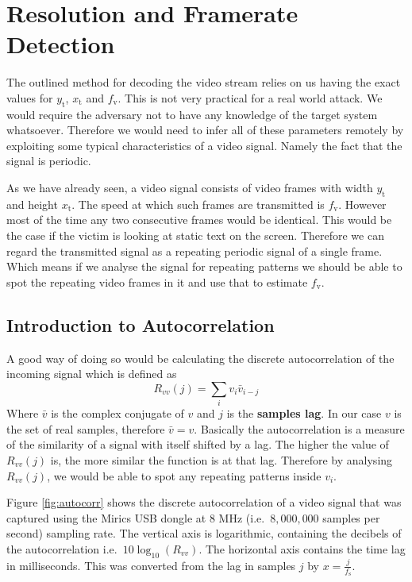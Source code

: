 \documentclass[a4paper,12pt,twoside,openright]{report}
\begin{document}
\section{Resolution and Framerate Detection}

The outlined method for decoding the video stream relies on us having the exact values for $y_\text{t}$, $x_\text{t}$ and $f_\text{v}$. This is not very practical for a real world attack. We would require the adversary not to have any knowledge of the target system whatsoever. Therefore we would need to infer all of these parameters remotely by exploiting some typical characteristics of a video signal. Namely the fact that the signal is periodic.

As we have already seen, a video signal consists of video frames with width $y_\text{t}$ and height $x_\text{t}$. The speed at which such frames are transmitted is $f_\text{v}$. However most of the time any two consecutive frames would be identical. This would be the case if the victim is looking at static text on the screen. Therefore we can regard the transmitted signal as a repeating periodic signal of a single frame. Which means if we analyse the signal for repeating patterns we should be able to spot the repeating video frames in it and use that to estimate $f_\text{v}$.

\subsection{Introduction to Autocorrelation}
A good way of doing so would be calculating the discrete autocorrelation \cite{bracewell1965autocorrelation} of the incoming signal which is defined as 
$$ R_{vv}(j)=\sum\limits_{i} v_{i} \bar{v}_{i-j} $$
Where $\bar{v}$ is the complex conjugate of $v$ and $j$ is the \textbf{samples lag}. In our case $v$ is the set of real samples, therefore $\bar{v} = v$. Basically the autocorrelation is a measure of the similarity of a signal with itself shifted by a lag. The higher the value of $R_{vv}(j)$ is, the more similar the function is at that lag. Therefore by analysing $R_{vv}(j)$, we would be able to spot any repeating patterns inside $v_{i}$.

Figure \ref{fig:autocorr} shows the discrete autocorrelation of a video signal that was captured using the Mirics USB dongle at 8 MHz (i.e.\  $8,000,000$ samples per second) sampling rate. The vertical axis is logarithmic, containing the decibels of the autocorrelation i.e.\  $10 \log_{10}( R_{vv} )$. The horizontal axis contains the time lag in milliseconds. This was converted from the lag in samples $j$ by $x = \frac{j}{f_\text{s}}$.
\end{document}

